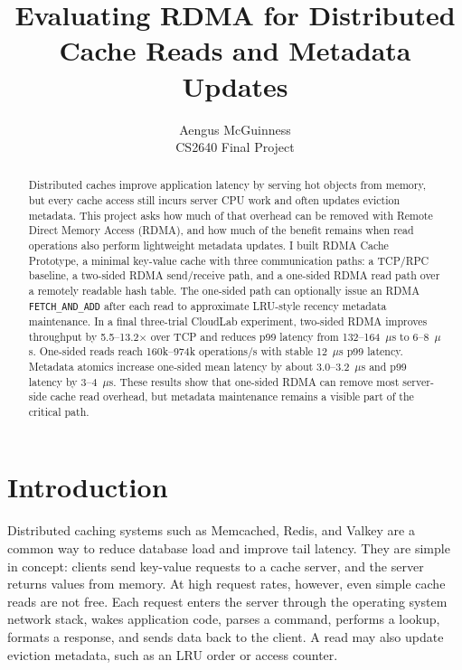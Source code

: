 \documentclass[letterpaper,twocolumn,10pt]{article}
\newcommand{\sys}{RDMA Cache Prototype}
\begin{document}

\date{}

\title{\Large \bf Evaluating RDMA for Distributed Cache Reads and Metadata Updates}

\author{
{\rm Aengus McGuinness}\\
CS2640 Final Project
}

\maketitle

\begin{abstract}
Distributed caches improve application latency by serving hot objects from
memory, but every cache access still incurs server CPU work and often updates
eviction metadata.  This project asks how much of that overhead can be removed
with Remote Direct Memory Access (RDMA), and how much of the benefit remains
when read operations also perform lightweight metadata updates.  I built
\sys{}, a minimal key-value cache with three communication paths: a TCP/RPC
baseline, a two-sided RDMA send/receive path, and a one-sided RDMA read path
over a remotely readable hash table.  The one-sided path can optionally issue
an RDMA \texttt{FETCH\_AND\_ADD} after each read to approximate LRU-style
recency metadata maintenance.  In a final three-trial CloudLab experiment,
two-sided RDMA improves throughput by 5.5--13.2$\times$ over TCP and reduces
p99 latency from 132--164~$\mu$s to 6--8~$\mu$s.  One-sided reads reach
160k--974k operations/s with stable 12~$\mu$s p99 latency.  Metadata atomics
increase one-sided mean latency by about 3.0--3.2~$\mu$s and p99 latency by
3--4~$\mu$s.  These results show that one-sided RDMA can remove most
server-side cache read overhead, but metadata maintenance remains a visible
part of the critical path.
\end{abstract}

\section{Introduction}

Distributed caching systems such as Memcached, Redis, and Valkey are a common
way to reduce database load and improve tail latency.  They are simple in
concept: clients send key-value requests to a cache server, and the server
returns values from memory.  At high request rates, however, even simple cache
reads are not free.  Each request enters the server through the operating
system network stack, wakes application code, parses a command, performs a
lookup, formats a response, and sends data back to the client.  A read may
also update eviction metadata, such as an LRU order or access counter.
\end{document}
